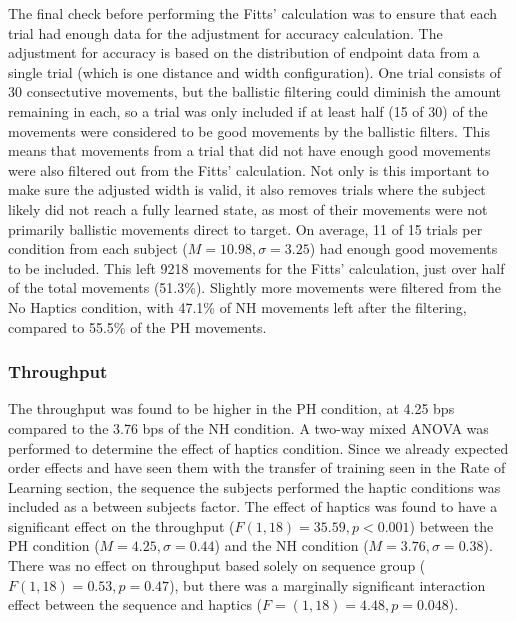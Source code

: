 The final check before performing the Fitts' calculation was to ensure that each trial had enough data for the adjustment for accuracy calculation.
The adjustment for accuracy is based on the distribution of endpoint data from a single trial (which is one distance and width configuration).
One trial consists of 30 consectutive movements, but the ballistic filtering could diminish the amount remaining in each, so a trial was only included if at least half (15 of 30) of the movements were considered to be good movements by the ballistic filters.
This means that movements from a trial that did not have enough good movements were also filtered out from the Fitts' calculation.
Not only is this important to make sure the adjusted width is valid, it also removes trials where the subject likely did not reach a fully learned state, as most of their movements were not primarily ballistic movements direct to target.
On average, 11 of 15 trials per condition from each subject ($M=10.98, \sigma=3.25$) had enough good movements to be included.
This left 9218 movements for the Fitts' calculation, just over half of the total movements (51.3\%).
Slightly more movements were filtered from the No Haptics condition, with 47.1\% of NH movements left after the filtering, compared to 55.5\% of the PH movements.

\subsubsection{Throughput}

The throughput was found to be higher in the PH condition, at 4.25 bps compared to the 3.76 bps of the NH condition.
A two-way mixed ANOVA was performed to determine the effect of haptics condition.
Since we already expected order effects and have seen them with the transfer of training seen in the Rate of Learning section, the sequence the subjects performed the haptic conditions was included as a between subjects factor.
The effect of haptics was found to have a significant effect on the throughput ($F(1,18)=35.59, p<0.001$) between the PH condition ($M=4.25, \sigma=0.44$) and the NH condition ($M=3.76, \sigma=0.38$).
There was no effect on throughput based solely on sequence group ($F(1,18)=0.53, p=0.47$), but there was a marginally significant interaction effect between the sequence and haptics ($F=(1,18)=4.48, p=0.048$).

